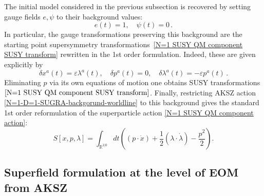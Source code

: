 \documentclass[a4paper,12pt]{article}
\numberwithin{equation}{section} %
\numberwithin{equation}{section}
\begin{document}
The initial model considered in the previous subsection is recovered by setting gauge fields $e,\psi$ to their background values: 
\begin{equation}\label{N=1-D=1-SUGRA-backgorund-worldline}
    e(t) = 1,\quad  \psi(t)=0\,.
\end{equation}
In particular, the gauge transformations preserving this background are the starting point supersymmetry transformations~\eqref{N=1 SUSY QM component SUSY transform} rewritten in the 1st order formulation. Indeed, these are given explicitly by
\begin{equation}
    \delta x^a(t) =  \varepsilon\lambda^a(t),  \quad \delta p^a(t) = 0, \quad \delta\lambda^a(t) = - \varepsilon p^a(t)\,.
\end{equation}
Eliminating $p$ via its own equations of motion one obtains SUSY transformations $\eqref{N=1 SUSY QM component SUSY transform}$. Finally, restricting AKSZ action \eqref{N=1-D=1-SUGRA-backgorund-worldline} to this background gives the standard 1st order reformulation of the superparticle action \eqref{N=1 SUSY QM component action}:
\begin{equation}\label{N=1-SQM-First-order-action}
    S[x,p,\lambda] = \int_{\mathbb{R}^{1|0}}dt\left((p\cdot\dot{x}) + \frac{1}{2}(\lambda \cdot \dot{\lambda}) - \frac{p^2}{2} \right).
\end{equation}


\subsection{Superfield formulation at the level of EOM from AKSZ}
\end{document}
